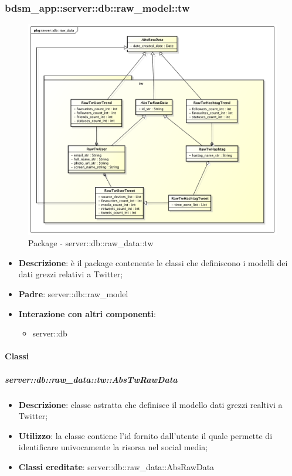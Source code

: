 		\subsubsection{bdsm\_app::server::db::raw\_model::tw} %
		\label{ssub:bdsm_app_server_db_raw_model_tw}
		\begin{figure}[htbp]
			\centering
			\centerline{\includegraphics[scale=0.45]{./images/server/raw_data_tw.pdf}}
			\caption{Package - server::db::raw\_data::tw}
		\end{figure}

		\begin{itemize}
		  \item \textbf{Descrizione}: è il package contenente le classi che definiscono i modelli dei dati grezzi relativi a Twitter;
		  \item \textbf{Padre}: server::db::raw\_model
		  \item \textbf{Interazione con altri componenti}:
		  	\begin{itemize}
		  		\item server::db
				\end{itemize}
		\end{itemize}

		\paragraph{Classi} %


		\subparagraph{server::db::raw\_data::tw::AbsTwRawData} %
		\label{subp:server_db_raw_data_tw_abstwrawdata}
			\begin{itemize}
				\item \textbf{Descrizione}: classe astratta che definisce il modello dati grezzi realtivi a Twitter;
				\item \textbf{Utilizzo}: la classe contiene l'id fornito dall'utente il quale permette di identificare univocamente la risorsa nel social media;
				\item \textbf{Classi ereditate}: server::db::raw\_data::AbsRawData
			\end{itemize}


